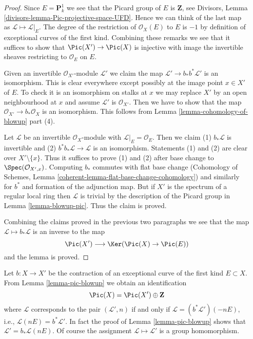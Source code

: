 \begin{proof}
Since $E = \mathbf{P}^1_k$ we see that the Picard group of $E$
is $\mathbf{Z}$, see Divisors, Lemma
\ref{divisors-lemma-Pic-projective-space-UFD}.
Hence we can think of the last map as $\mathcal{L} \mapsto \mathcal{L}|_E$.
The degree of the restriction of $\mathcal{O}_X(E)$ to $E$ is $-1$
by definition of exceptional curves of the first kind. Combining these
remarks we see that it
suffices to show that $\Pic(X') \to \Pic(X)$ is injective
with image the invertible sheaves restricting to $\mathcal{O}_E$ on $E$.

\medskip\noindent
Given an invertible $\mathcal{O}_{X'}$-module
$\mathcal{L}'$ we claim the map $\mathcal{L}' \to b_*b^*\mathcal{L}'$
is an isomorphism. This is clear everywhere except possibly at the image
point $x \in X'$ of $E$. To check it is an isomorphism on stalks
at $x$ we may replace $X'$ by an open neighbourhood at $x$ and
assume $\mathcal{L}'$ is $\mathcal{O}_{X'}$. Then we have to
show that the map $\mathcal{O}_{X'} \to b_*\mathcal{O}_X$
is an isomorphism. This follows from Lemma \ref{lemma-cohomology-of-blowup}
part (4).

\medskip\noindent
Let $\mathcal{L}$ be an invertible $\mathcal{O}_X$-module with
$\mathcal{L}|_E = \mathcal{O}_E$. Then we claim 
(1) $b_*\mathcal{L}$ is invertible and
(2) $b^*b_*\mathcal{L} \to \mathcal{L}$ is an isomorphism.
Statements (1) and (2) are clear over $X' \setminus \{x\}$.
Thus it suffices to prove (1) and (2) after base change
to $\Spec(\mathcal{O}_{X', x})$.
Computing $b_*$ commutes with flat base change
(Cohomology of Schemes, Lemma \ref{coherent-lemma-flat-base-change-cohomology})
and similarly for $b^*$ and formation of the adjunction map.
But if $X'$ is the spectrum of a regular local ring
then $\mathcal{L}$ is trivial by the description of
the Picard group in Lemma \ref{lemma-blowup-pic}. Thus
the claim is proved.

\medskip\noindent
Combining the claims proved in the previous two paragraphs we
see that the map $\mathcal{L} \mapsto b_*\mathcal{L}$
is an inverse to the map
$$
\Pic(X') \longrightarrow \Ker(\Pic(X) \to \Pic(E))
$$
and the lemma is proved.
\end{proof}

\begin{remark}
\label{remark-pic-blowup}
Let $b : X \to X'$ be the contraction of an
exceptional curve of the first kind $E \subset X$.
From Lemma \ref{lemma-pic-blowup} we obtain an identification
$$
\Pic(X) = \Pic(X') \oplus \mathbf{Z}
$$
where $\mathcal{L}$ corresponds to the pair $(\mathcal{L}', n)$ if and only if
$\mathcal{L} = (b^*\mathcal{L}')(-nE)$, i.e.,
$\mathcal{L}(nE) = b^*\mathcal{L}'$. In fact the proof of
Lemma \ref{lemma-pic-blowup} shows that $\mathcal{L}' = b_*\mathcal{L}(nE)$.
Of course the assignment $\mathcal{L} \mapsto \mathcal{L}'$ is
a group homomorphism.
\end{remark}

